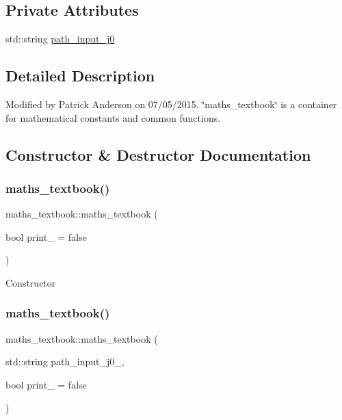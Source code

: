 \subsection*{Private Attributes}
\begin{DoxyCompactItemize}
\item 
std\+::string \mbox{\hyperlink{classmaths__textbook_a5c8a254bd117beaba43916c38f8f6a66}{path\+\_\+input\+\_\+j0}}
\end{DoxyCompactItemize}


\subsection{Detailed Description}
Modified by Patrick Anderson on 07/05/2015. \char`\"{}maths\+\_\+textbook\char`\"{} is a container for mathematical constants and common functions. 

\subsection{Constructor \& Destructor Documentation}
\mbox{\label{classmaths__textbook_a5a7c7fedbd125f32ce35deb6664a19d9}} 
\subsubsection{\texorpdfstring{maths\_textbook()}{maths\_textbook()}\hspace{0.1cm}{\footnotesize\ttfamily [1/2]}}
{\footnotesize\ttfamily maths\+\_\+textbook\+::maths\+\_\+textbook (\begin{DoxyParamCaption}\item[{bool}]{print\+\_\+ = {\ttfamily false} }\end{DoxyParamCaption})}

Constructor \mbox{\label{classmaths__textbook_a56743163bbb37c83a95d8cb1ca1cc35b}} 
\subsubsection{\texorpdfstring{maths\_textbook()}{maths\_textbook()}\hspace{0.1cm}{\footnotesize\ttfamily [2/2]}}
{\footnotesize\ttfamily maths\+\_\+textbook\+::maths\+\_\+textbook (\begin{DoxyParamCaption}\item[{std\+::string}]{path\+\_\+input\+\_\+j0\+\_\+,  }\item[{bool}]{print\+\_\+ = {\ttfamily false} }\end{DoxyParamCaption})}


